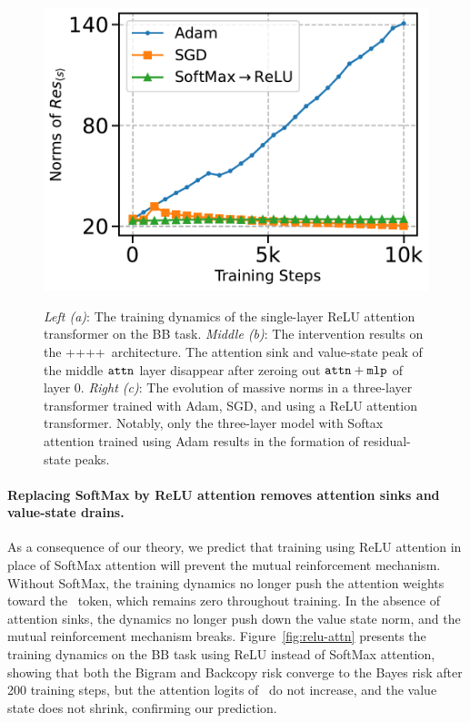 \begin{figure}
  \begin{minipage}{0.33\textwidth}
      \centering
      \label{fig:sgd}
      \includegraphics[width=\textwidth]{Figures/BBM/adam_vs_sgd.pdf}
  \end{minipage}
    \caption{\small %
    \textit{Left (a)}: The training dynamics of the single-layer ReLU attention transformer on the BB task.
    \textit{Middle (b)}: The intervention results on the \attn+\mlp+\attn+\mlp+\mlp~architecture. The attention sink and value-state peak of the middle ${\tt attn}$ layer disappear after zeroing out ${\tt attn}+{\tt mlp}$ of layer 0. 
    \textit{Right (c)}: The evolution of massive norms in a three-layer transformer trained with Adam, SGD, and using a ReLU attention transformer. Notably, only the three-layer model with Softax attention trained using Adam results in the formation of residual-state peaks.}
\end{figure}


\paragraph{Replacing SoftMax by ReLU attention removes attention sinks and value-state drains.} As a consequence of our theory, we predict that training using ReLU attention in place of SoftMax attention will prevent the mutual reinforcement mechanism. Without SoftMax, the training dynamics no longer push the attention weights toward the \bos~token, which remains zero throughout training. In the absence of attention sinks, the dynamics no longer push down the value state norm, and the mutual reinforcement mechanism breaks. Figure~\ref{fig:relu-attn} presents the training dynamics on the BB task using ReLU instead of SoftMax attention, showing that both the Bigram and Backcopy risk converge to the Bayes risk after 200 training steps, but the attention logits of \bos~do not increase, and the value state does not shrink, confirming our prediction. 


